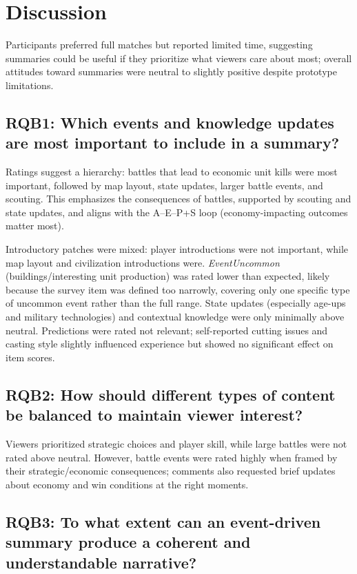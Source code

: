 \section{Discussion}

Participants preferred full matches but reported limited time, suggesting summaries could be useful if they prioritize what viewers care about most; overall attitudes toward summaries were neutral to slightly positive despite prototype limitations.

\subsection{RQB1: Which events and knowledge updates are most important to include in a summary?}

Ratings suggest a hierarchy: battles that lead to economic unit kills were most important, followed by map layout, state updates, larger battle events, and scouting. This emphasizes the consequences of battles, supported by scouting and state updates, and aligns with the A--E--P+S loop (economy-impacting outcomes matter most).

Introductory patches were mixed: player introductions were not important, while map layout and civilization introductions were. \textit{EventUncommon} (buildings/interesting unit production) was rated lower than expected, likely because the survey item was defined too narrowly, covering only one specific type of uncommon event rather than the full range. State updates (especially age-ups and military technologies) and contextual knowledge were only minimally above neutral. Predictions were rated not relevant; self-reported cutting issues and casting style slightly influenced experience but showed no significant effect on item scores.

\subsection{RQB2: How should different types of content be balanced to maintain viewer interest?}

Viewers prioritized strategic choices and player skill, while large battles were not rated above neutral. However, battle events were rated highly when framed by their strategic/economic consequences; comments also requested brief updates about economy and win conditions at the right moments.

\subsection{RQB3: To what extent can an event-driven summary produce a coherent and understandable narrative?}

